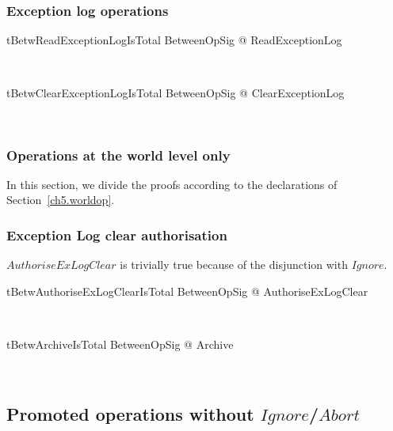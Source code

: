 \subsubsection*{Exception log operations}

\begin{LNewThm}
\begin{theorem}{tBetwReadExceptionLogIsTotal}
   \forall BetweenOpSig @ \pre ReadExceptionLog
\end{theorem}~\end{LNewThm}

\begin{LNewThm}
\begin{theorem}{tBetwClearExceptionLogIsTotal}
   \forall BetweenOpSig @ \pre ClearExceptionLog
\end{theorem}~\end{LNewThm}

\subsubsection{Operations at the world level only}

In this section, we divide the proofs according to the declarations of Section~\ref{ch5.worldop}.

\subsubsection*{Exception Log clear authorisation}

$AuthoriseExLogClear$ is trivially true because of the disjunction with $Ignore$.
%
\begin{LNewThm}
\begin{theorem}{tBetwAuthoriseExLogClearIsTotal}
   \forall BetweenOpSig @ \pre AuthoriseExLogClear
\end{theorem}~\end{LNewThm}

\begin{LNewThm}
\begin{theorem}{tBetwArchiveIsTotal}
   \forall BetweenOpSig @ \pre Archive
\end{theorem}~\end{LNewThm}

\subsection{Promoted operations without $Ignore$/$Abort$}\label{ch8.specproof-betw.promotedalone}

